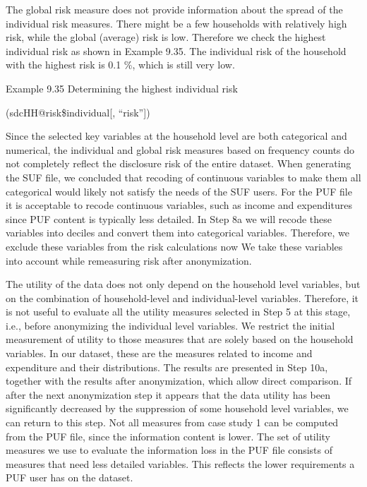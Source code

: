 \documentclass[letterpaper,10pt,english]{sphinxmanual}
\begin{document}
The global risk measure does not provide information about the spread of
the individual risk measures. There might be a few households with
relatively high risk, while the global (average) risk is low. Therefore
we check the highest individual risk as shown in Example 9.35. The
individual risk of the household with the highest risk is 0.1 \%, which
is still very low.

Example 9.35 Determining the highest individual risk

\begin{DUlineblock}{0em}
\item[] 
\item[] (sdcHH@risk\$individual{[}, “risk”{]})
\end{DUlineblock}


Since the selected key variables at the household level are both
categorical and numerical, the individual and global risk measures based
on frequency counts do not completely reflect the disclosure risk of the
entire dataset. When generating the SUF file, we concluded that recoding
of continuous variables to make them all categorical would likely not
satisfy the needs of the SUF users. For the PUF file it is acceptable to
recode continuous variables, such as income and expenditures since PUF
content is typically less detailed. In Step 8a we will recode these
variables into deciles and convert them into categorical variables.
Therefore, we exclude these variables from the risk calculations now We
take these variables into account while remeasuring risk after
anonymization.


The utility of the data does not only depend on the household level
variables, but on the combination of household-level and
individual-level variables. Therefore, it is not useful to evaluate all
the utility measures selected in Step 5 at this stage, i.e., before
anonymizing the individual level variables. We restrict the initial
measurement of utility to those measures that are solely based on the
household variables. In our dataset, these are the measures related to
income and expenditure and their distributions. The results are
presented in Step 10a, together with the results after anonymization,
which allow direct comparison. If after the next anonymization step it
appears that the data utility has been significantly decreased by the
suppression of some household level variables, we can return to this
step.  Not all measures from case study 1 can be
computed from the PUF file, since the information content is lower. The
set of utility measures we use to evaluate the information loss in the
PUF file consists of measures that need less detailed variables. This
reflects the lower requirements a PUF user has on the dataset.
\end{document}
